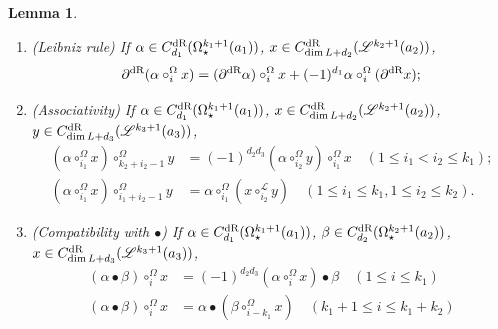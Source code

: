 \documentclass[10pt]{amsart}
\numberwithin{equation}{section}
\theoremstyle{plain}
\newtheorem{lemma}[theorem]{Lemma}
\theoremstyle{definition}
\theoremstyle{remark}
\numberwithin{equation}{section}
\newcommand{\dR}{\textup{dR}}
\begin{document}
{\begin{lemma}\label{Lm: dRchainOpenClosedApp}
	\begin{enumerate}
		\item (Leibniz rule) If $\alpha\in C^\dR_{d_1}(\Omega_\star^{k_1+1}(a_1))$, $x\in C^\dR_{\dim L + d_2}(\mathscr{L}^{k_2+1}(a_2))$, 
		\[\partial^\dR(\alpha\circ_i^\Omega x) =(\partial^\dR \alpha)\circ_i^\Omega x + (-1)^{d_1} \alpha \circ_i^\Omega (\partial^\dR x);\]
		\item (Associativity) If $\alpha\in C_{d_1}^\dR(\Omega_\star^{k_1+1}(a_1))$, $x\in C_{\dim L + d_2}^\dR (\mathscr{L}^{k_2+1}(a_2))$, $y\in C^\dR_{\dim L + d_3}(\mathscr{L}^{k_3+1}(a_3))$,\begin{align*}
			(\alpha\circ_{i_1}^\Omega x)\circ^\Omega_{k_2+i_2-1} y &= (-1)^{d_2d_3} (\alpha\circ_{i_2}^\Omega y)\circ_{i_1}^\Omega x \quad (1 \leq i_1 < i_2 \leq k_1);\\
			(\alpha \circ_{i_1}^\Omega x)\circ_{i_1+i_2-1}^\Omega y&= \alpha\circ_{i_1}^\Omega(x\circ_{i_2}^\mathscr{L} y)  \quad  (1 \leq i_1 \leq k_1, 1 \leq i_2 \leq k_2).
		\end{align*}
		\item (Compatibility with $\bullet$) If $\alpha\in C_{d_1}^\dR(\Omega_\star^{k_1+1}(a_1))$, $\beta \in C_{d_2}^\dR(\Omega_\star^{k_2+1}(a_2))$, $x\in C_{\dim L+d_3}^\dR(\mathscr{L}^{k_3+1}(a_3))$, \begin{align*}
			(\alpha \bullet \beta) \circ^\Omega_i x&= (-1)^{d_2d_3} (\alpha\circ^\Omega_i x) \bullet \beta \quad (1\leq i \leq k_1) \\
			(\alpha \bullet \beta) \circ_i^\Omega x&=  \alpha \bullet (\beta \circ_{i-k_1}^\Omega x)\quad (k_1+1\leq i \leq k_1+k_2)
		\end{align*}
	\end{enumerate}
\end{lemma}

}
\end{document}

